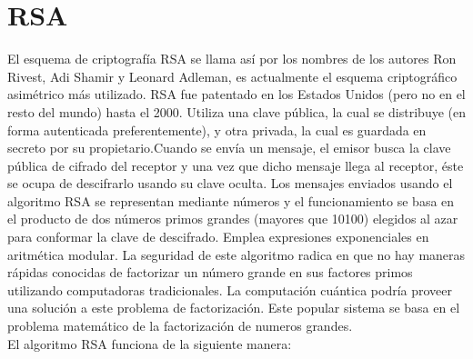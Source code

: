



\section{RSA}

El esquema de criptografía RSA se llama así por los nombres de los autores Ron Rivest, Adi Shamir y Leonard Adleman, es actualmente el esquema criptográfico asimétrico más utilizado. RSA fue patentado en los Estados Unidos (pero no en el resto del mundo) hasta el 2000. Utiliza una clave pública, la cual se distribuye (en forma autenticada preferentemente), y otra privada, la cual es guardada en secreto por su propietario.Cuando se envía un mensaje, el emisor busca la clave pública de cifrado del receptor y una vez que dicho mensaje llega al receptor, éste se ocupa de descifrarlo usando su clave oculta. Los mensajes enviados usando el algoritmo RSA se representan mediante números y el funcionamiento se basa en el producto de dos números primos grandes (mayores que 10100) elegidos al azar para conformar la clave de descifrado. Emplea expresiones exponenciales en aritmética modular. La seguridad de este algoritmo radica en que no hay maneras rápidas conocidas de factorizar un número grande en sus factores primos utilizando computadoras tradicionales.
La computación cuántica podría proveer una solución a este problema de factorización. Este popular sistema se basa en el problema matemático de la factorización de numeros grandes. \\
El algoritmo RSA funciona de la siguiente manera: \\

